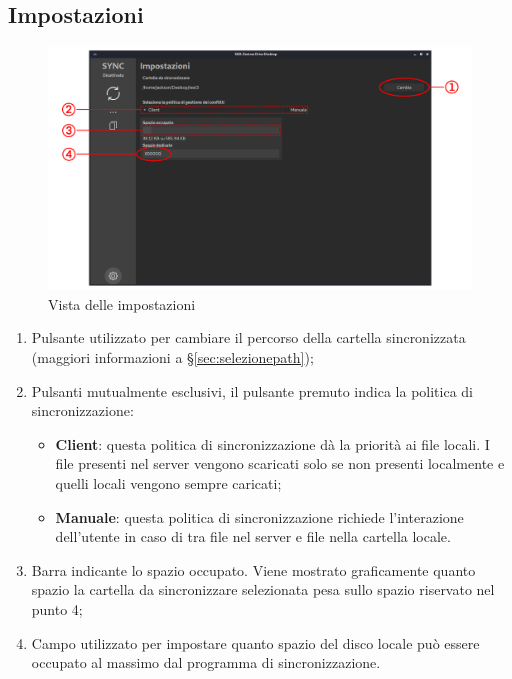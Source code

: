 \subsection{Impostazioni} \label{sec:impostazioni}
\begin{figure}[H]
    \centering
    \includegraphics[scale = 0.30]{components/img/settings.png}
    \caption{Vista delle impostazioni}
    \label{fig:Vista delle impostazioni}
\end{figure}
\begin{enumerate}
	\item Pulsante utilizzato per cambiare il percorso della cartella sincronizzata (maggiori informazioni a \S{}\ref{sec:selezionepath});
	\item Pulsanti mutualmente esclusivi, il pulsante premuto indica la politica di sincronizzazione:
	\begin{itemize}
		\item \textbf{Client}: questa politica di sincronizzazione dà la priorità ai file locali. I file presenti nel server vengono scaricati solo se non presenti localmente e quelli locali vengono sempre caricati;
		\item \textbf{Manuale}: questa politica di sincronizzazione richiede l'interazione dell'utente in caso di  tra file nel server e file nella cartella locale.
	\end{itemize}
	\item Barra indicante lo spazio occupato. Viene mostrato graficamente quanto spazio la cartella da sincronizzare selezionata pesa sullo spazio riservato nel punto 4;
	\item Campo utilizzato per impostare quanto spazio del disco locale può essere occupato al massimo dal programma di sincronizzazione.
\end{enumerate}